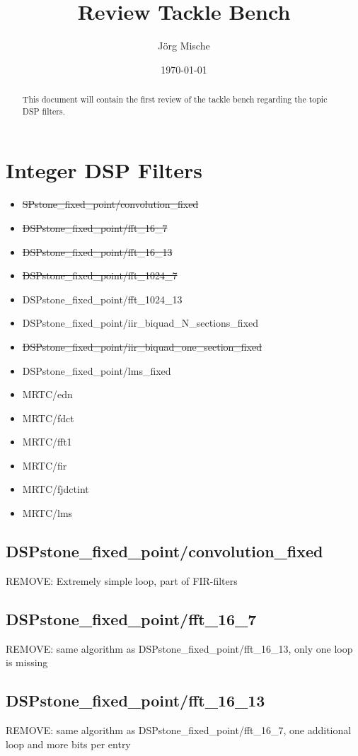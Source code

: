 \documentclass[a4paper]{article}
\title{Review Tackle Bench}
\author{Jörg Mische}
\date{\today}
\begin{document}
\maketitle

\begin{abstract}
This document will contain the first review of the tackle bench regarding the 
topic DSP filters.
\end{abstract}


\section{Integer DSP Filters}

\begin{itemize}
	\item \st{SPstone\_fixed\_point/convolution\_fixed}
	\item \st{DSPstone\_fixed\_point/fft\_16\_7}
	\item \st{DSPstone\_fixed\_point/fft\_16\_13}
	\item \st{DSPstone\_fixed\_point/fft\_1024\_7}
	\item DSPstone\_fixed\_point/fft\_1024\_13
	\item DSPstone\_fixed\_point/iir\_biquad\_N\_sections\_fixed
	\item \st{DSPstone\_fixed\_point/iir\_biquad\_one\_section\_fixed}
	\item DSPstone\_fixed\_point/lms\_fixed
	\item MRTC/edn
	\item MRTC/fdct
	\item MRTC/fft1
	\item MRTC/fir
	\item MRTC/fjdctint
	\item MRTC/lms
\end{itemize}



\subsection{DSPstone\_fixed\_point/convolution\_fixed}
	REMOVE: Extremely simple loop, part of FIR-filters
\subsection{DSPstone\_fixed\_point/fft\_16\_7}
	REMOVE: same algorithm as DSPstone\_fixed\_point/fft\_16\_13, only one loop is missing
\subsection{DSPstone\_fixed\_point/fft\_16\_13}
	REMOVE: same algorithm as DSPstone\_fixed\_point/fft\_16\_7, one additional loop and more bits per entry
\end{document}

